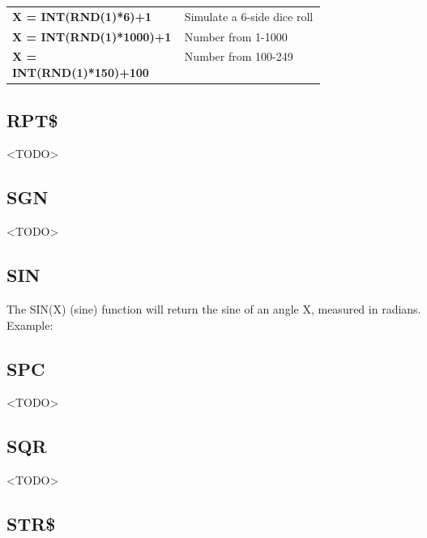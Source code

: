 \begin{tabular}{l p{0.45\linewidth}}

	{\ttfamily\bfseries X = INT(RND(1)*6)+1} & Simulate a 6-side dice roll\\

	{\ttfamily\bfseries X = INT(RND(1)*1000)+1} & Number from 1-1000\\

	{\ttfamily\bfseries X = INT(RND(1)*150)+100} & Number from 100-249\\

\end{tabular}

\vspace{16pt}

\subsection{RPT\$}

<TODO>

\subsection{SGN}

<TODO>

\subsection{SIN}

The {\ttfamily SIN(X)} (sine) function will return the sine of an angle
{\ttfamily X}, measured in radians.\\

Example:\\


\subsection{SPC}

<TODO>

\subsection{SQR}

<TODO>

\subsection{STR\$}

